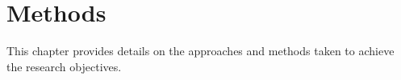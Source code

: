 

\chapter{Methods} \label{methods}

This chapter provides details on the approaches and methods taken to achieve the research objectives.
